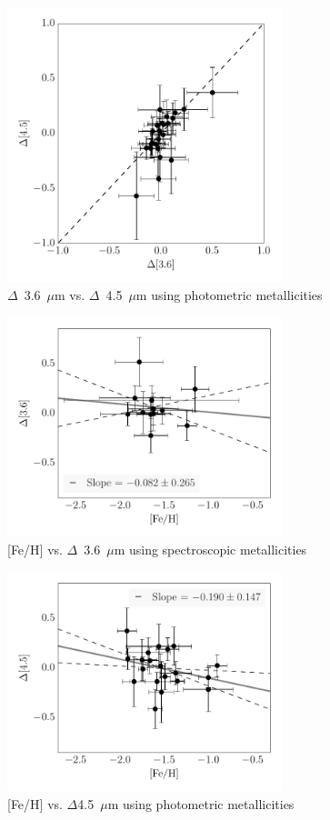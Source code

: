 \documentclass[a4paper,fleqn,usenatbib]{mnras}
\begin{document}
\begin{figure}
\begin{center}
\includegraphics[width=80mm]{final_plots/deltadelta_3p6_4p5_phot.pdf}
\caption{$\Delta$~3.6~$\mu$m vs. $\Delta$~4.5~$\mu$m using photometric metallicities}
\label{fig:deltadelta_phot}
\end{center}
\end{figure}

\begin{figure}
\begin{center}
\includegraphics[width=80mm]{final_plots/delta_feh_3p6_spect.pdf}
\caption{[Fe/H] vs. $\Delta$~3.6~$\mu$m using spectroscopic metallicities}
\label{fig:delta_3p6_spect}
\end{center}
\end{figure}

\begin{figure}
\begin{center}
\includegraphics[width=80mm]{final_plots/delta_feh_4p5_phot.pdf}
\caption{[Fe/H] vs. $\Delta$4.5~$\mu$m using photometric metallicities}
\label{fig:delta_4p5_phot}
\end{center}
\end{figure}
\end{document}
